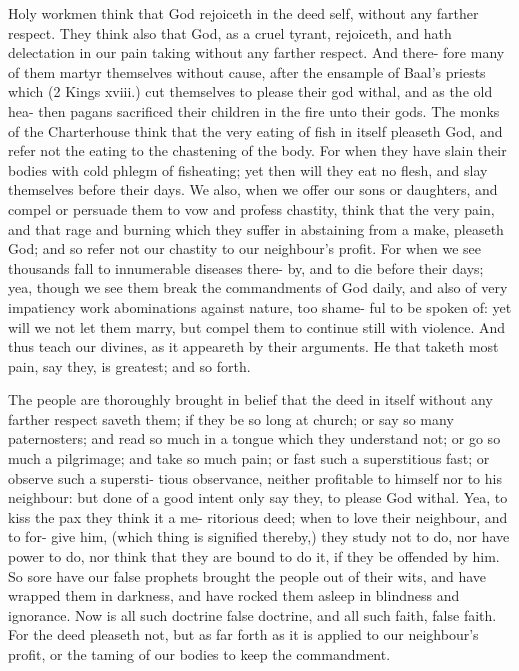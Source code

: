 \documentclass{custom}
\begin{document}
Holy workmen think that God rejoiceth in the deed 
self, without any farther respect. They think also that 
God, as a cruel tyrant, rejoiceth, and hath delectation in 
our pain taking without any farther respect. And there- 
fore many of them martyr themselves without cause, after 
the ensample of Baal's priests which (2 Kings xviii.) cut 
themselves to please their god withal, and as the old hea- 
then pagans sacrificed their children in the fire unto their 
gods. The monks of the Charterhouse think that the very 
eating of fish in itself pleaseth God, and refer not the 
eating to the chastening of the body. For when they have 
slain their bodies with cold phlegm of fisheating; yet then 
will they eat no flesh, and slay themselves before their 
days. We also, when we offer our sons or daughters, and 
compel or persuade them to vow and profess chastity, 
think that the very pain, and that rage and burning which 
they suffer in abstaining from a make, pleaseth God; and 
so refer not our chastity to our neighbour's profit. For 
when we see thousands fall to innumerable diseases there- 
by, and to die before their days; yea, though we see them 
break the commandments of God daily, and also of very 
impatiency work abominations against nature, too shame- 
ful to be spoken of: yet will we not let them marry, but 
compel them to continue still with violence. And thus 
teach our divines, as it appeareth by their arguments. He 
that taketh most pain, say they, is greatest; and so forth. 

The people are thoroughly brought in belief that the 
deed in itself without any farther respect saveth them; 
if they be so long at church; or say so many paternosters; 
and read so much in a tongue which they understand not; 
or go so much a pilgrimage; and take so much pain; or 
fast such a superstitious fast; or observe such a supersti- 
tious observance, neither profitable to himself nor to his 
neighbour: but done of a good intent only say they, to 
please God withal. Yea, to kiss the pax they think it a me- 
ritorious deed; when to love their neighbour, and to for- 
give him, (which thing is signified thereby,) they study not 
to do, nor have power to do, nor think that they are 
bound to do it, if they be offended by him. So sore 
have our false prophets brought the people out of their 
wits, and have wrapped them in darkness, and have rocked 
them asleep in blindness and ignorance. Now is all such 
doctrine false doctrine, and all such faith, false faith. For 
the deed pleaseth not, but as far forth as it is applied to 
our neighbour's profit, or the taming of our bodies to keep 
the commandment. 
\end{document}

